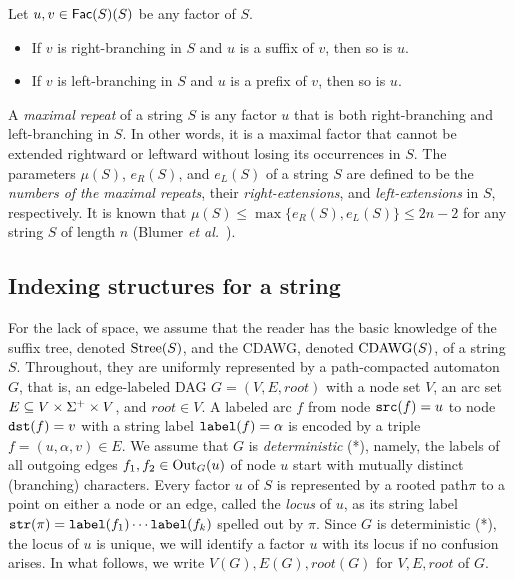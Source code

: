 \begin{lemma}\label{lem:closure:branching}
  Let $u, v \in \mathsf{Fac}{(S)}(S)$ be any factor of $S$.
\begin{itemize}
\item If $v$ is right-branching in $S$ and $u$ is a suffix of $v$, then so is $u$. 
\item If $v$ is left-branching in $S$ and $u$ is a prefix of $v$, then so is $u$. 
\end{itemize}
\end{lemma}

A \textit{maximal repeat} of a string $S$ is any factor $u$ that is both right-branching and left-branching in $S$. In other words, it is a maximal factor that cannot be extended rightward or leftward without losing its occurrences in $S$. 
The parameters $\mu(S)$, $e_R(S)$, and $e_L(S)$ of a string $S$ are defined to be the \textit{numbers of the maximal repeats}, their \textit{right-extensions}, and \textit{left-extensions} in $S$, respectively. It is known that $\mu(S) \le \max\{e_R(S), e_L(S)\} \le 2n - 2$ for any string $S$ of length $n$ (Blumer \textit{et al.}~\cite{blumer1987complete}).




\subsection{Indexing structures for a string}
For the lack of space, we assume that the reader has the basic knowledge of the suffix tree, denoted $\mathrm{Stree}(S)$, and the CDAWG, denoted $\mathrm{CDAWG}(S)$, of a string $S$. 
Throughout, they are uniformly represented by a path-compacted automaton $G$, that is, an edge-labeled DAG $G = (V, E, root)$ with a node set $V$, an arc set $E\subseteq V\times \Sigma^+\times V$, and $root \in V$. 
A labeled arc $f$ from node $\mathtt{src}(f)=u$ to node $\mathtt{dst}(f)=v$ with a string label $\mathtt{label}(f)=\alpha$ is encoded by a triple $f = (u, \alpha, v) \in E$.  
We assume that $G$ is \textit{deterministic} (*), namely, the labels of all outgoing edges $f_1, f_2 \in \mathrm{Out}_{G}(u)$ of node $u$ start with mutually distinct (branching) characters.
Every factor $u$ of $S$ is represented by a rooted path$\pi$
to a point on either a node or an edge, called the \textit{locus} of $u$, as its string label $\mathtt{str}(\pi) = \mathtt{label}(f_1)\cdots \mathtt{label}(f_k)$ spelled out by $\pi$.
Since $G$ is deterministic (*), the locus of $u$ is unique, we will identify a factor $u$ with its locus if no confusion arises. 
In what follows, we write $V(G), E(G), root(G)$ for $V, E, root$ of $G$. 

